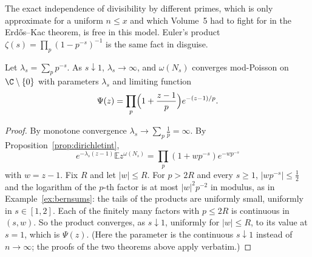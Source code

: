 The exact independence of divisibility by different primes, which is only approximate for a uniform $n\le x$ and which Volume~5 had to fight for in the Erd\H{o}s--Kac theorem, is free in this model. Euler's product
$\zeta(s)=\prod_p(1-p^{-s})^{-1}$ is the same fact in disguise.

\begin{theorem}\label{thm:omegamod}
Let $\lambda_s=\sum_pp^{-s}$. As $s\downarrow1$, $\lambda_s\to\infty$, and $\omega(N_s)$ converges mod-Poisson on $\C\setminus\{0\}$ with parameters $\lambda_s$ and limiting function
\[
\Psi(z)=\prod_p\Bigl(1+\frac{z-1}p\Bigr)e^{-(z-1)/p}.
\]
\end{theorem}
\begin{proof}
By monotone convergence $\lambda_s\to\sum_p\frac1p=\infty$. By Proposition~\ref{prop:dirichletint},
\[
e^{-\lambda_s(z-1)}\mathbb Ez^{\omega(N_s)}=\prod_p(1+wp^{-s})e^{-wp^{-s}}
\]
with $w=z-1$. Fix $R$ and let $|w|\le R$. For $p>2R$ and every $s\ge1$,
$|wp^{-s}|\le\frac12$ and the logarithm of the $p$-th factor is at most $|w|^2p^{-2}$ in modulus, as in Example~\ref{ex:bernsums}: the tails of the products are uniformly small, uniformly in $s\in[1,2]$. Each of the finitely many factors with
$p\le2R$ is continuous in $(s,w)$. So the product converges, as $s\downarrow1$, uniformly for $|w|\le R$, to its value at $s=1$, which is $\Psi(z)$. (Here the parameter is the continuous $s\downarrow1$ instead of $n\to\infty$; the proofs of the
two theorems above apply verbatim.)
\end{proof}

